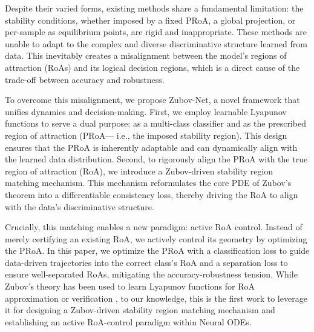 \documentclass[journal]{IEEEtran}
\begin{document}
Despite their varied forms, existing methods share a fundamental limitation:  the stability conditions, whether imposed by a fixed PRoA, a global projection, or per-sample as equilibrium points, are rigid and inappropriate. These methods are unable to adapt to the complex and diverse discriminative structure learned from data. This inevitably creates a misalignment between the model’s regions of attraction (RoAs) and its logical decision regions, which is a direct cause of the trade-off between accuracy and robustness.

To overcome this misalignment, we propose Zubov-Net, a novel framework that unifies dynamics and decision-making. First, we employ learnable Lyapunov functions to serve a dual purpose: as a multi-class classifier and as the prescribed region of attraction (PRoA— i.e., the imposed stability region). This design ensures that the PRoA is inherently adaptable and can dynamically align with the learned data distribution. Second, to rigorously align the PRoA with the true region of attraction (RoA), we introduce a Zubov-driven stability region matching mechanism. This mechanism reformulates the core PDE of Zubov’s theorem into a differentiable consistency loss, thereby driving the RoA to align with the data’s discriminative structure.

Crucially, this matching enables a new paradigm: active RoA control. Instead of merely certifying an existing RoA, we actively control its geometry by optimizing the PRoA. In this paper, we optimize the PRoA with a classification loss to guide data-driven trajectories into the correct class's RoA and a separation loss to ensure well-separated RoAs, mitigating the accuracy-robustness tension. While Zubov’s theory has been used to learn Lyapunov functions for RoA approximation or verification \cite{liu2025physics,kang2023data,li2025twostage}, to our knowledge, this is the first work to leverage it for designing a Zubov-driven stability region matching mechanism and establishing an active RoA-control paradigm within Neural ODEs.
\end{document}
